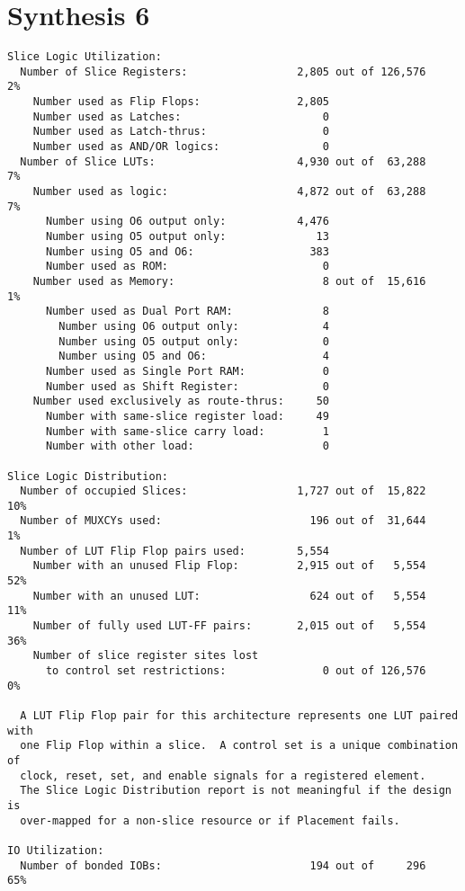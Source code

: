 \section*{Synthesis 6}
\begin{verbatim}
Slice Logic Utilization:
  Number of Slice Registers:                 2,805 out of 126,576    2%
    Number used as Flip Flops:               2,805
    Number used as Latches:                      0
    Number used as Latch-thrus:                  0
    Number used as AND/OR logics:                0
  Number of Slice LUTs:                      4,930 out of  63,288    7%
    Number used as logic:                    4,872 out of  63,288    7%
      Number using O6 output only:           4,476
      Number using O5 output only:              13
      Number using O5 and O6:                  383
      Number used as ROM:                        0
    Number used as Memory:                       8 out of  15,616    1%
      Number used as Dual Port RAM:              8
        Number using O6 output only:             4
        Number using O5 output only:             0
        Number using O5 and O6:                  4
      Number used as Single Port RAM:            0
      Number used as Shift Register:             0
    Number used exclusively as route-thrus:     50
      Number with same-slice register load:     49
      Number with same-slice carry load:         1
      Number with other load:                    0

Slice Logic Distribution:
  Number of occupied Slices:                 1,727 out of  15,822   10%
  Number of MUXCYs used:                       196 out of  31,644    1%
  Number of LUT Flip Flop pairs used:        5,554
    Number with an unused Flip Flop:         2,915 out of   5,554   52%
    Number with an unused LUT:                 624 out of   5,554   11%
    Number of fully used LUT-FF pairs:       2,015 out of   5,554   36%
    Number of slice register sites lost
      to control set restrictions:               0 out of 126,576    0%

  A LUT Flip Flop pair for this architecture represents one LUT paired with
  one Flip Flop within a slice.  A control set is a unique combination of
  clock, reset, set, and enable signals for a registered element.
  The Slice Logic Distribution report is not meaningful if the design is
  over-mapped for a non-slice resource or if Placement fails.

IO Utilization:
  Number of bonded IOBs:                       194 out of     296   65%


\end{verbatim}
